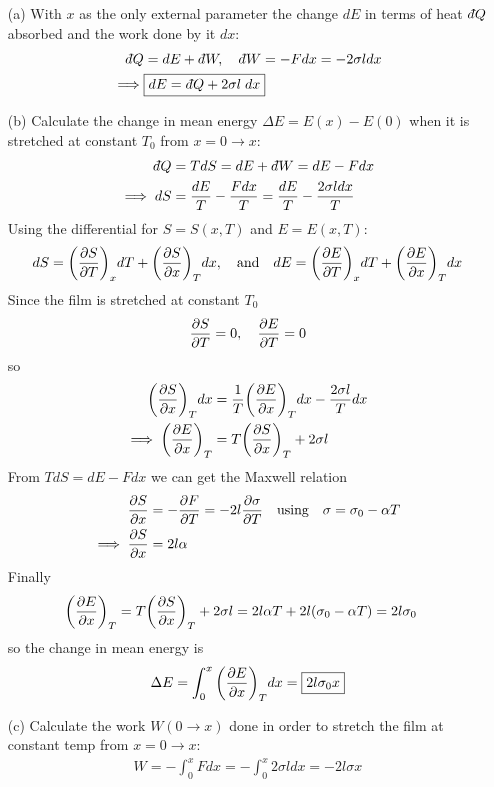 \documentclass[../main.tex]{subfiles}
\begin{document}
\begin{enumerate}
    \item [(a)] With $x$ as the only external parameter the change $dE$ in terms of heat $d\hspace*{-0.08em}\bar{}\hspace*{0.1em} Q$ absorbed and the work done by it $dx$:
    \begin{align*}
        d\hspace*{-0.08em}\bar{}\hspace*{0.1em} Q &= dE + d\hspace*{-0.08em}\bar{}\hspace*{0.1em} W, \quad d\hspace*{-0.08em}\bar{}\hspace*{0.1em} W = -F dx = -2\sigma l dx \\
        \implies & \boxed{
            dE = d\hspace*{-0.08em}\bar{}\hspace*{0.1em} Q + 2\sigma l\; dx
        }
    \end{align*}
    \item [(b)] Calculate the change in mean energy $\Delta E = E(x) - E(0)$ when it is stretched at constant $T_0$ from $x = 0 \to x$:
    \begin{align*}
        d\hspace*{-0.08em}\bar{}\hspace*{0.1em} Q &= T dS = dE + d\hspace*{-0.08em}\bar{}\hspace*{0.1em} W = dE - F dx \\
        \implies dS &= \frac{dE}{T} - \frac{F dx}{T} = \frac{dE}{T} - \frac{2\sigma l dx}{T}
    \end{align*}
    Using the differential for $S = S(x, T)$ and $E = E(x, T)$:
    \begin{align*}
        dS = \qt(\pdv{S}{T})_x dT + \qt(\pdv{S}{x})_T dx, \qand dE = \qt(\pdv{E}{T})_x dT + \qt(\pdv{E}{x})_T dx
    \end{align*}
    Since the film is stretched at constant $T_0$
    \begin{align*}
        \pdv{S}{T} = 0, \quad \pdv{E}{T} = 0
    \end{align*}
    so
    \begin{align*}
        \qt(\pdv{S}{x})_T dx &= \frac{1}{T} \qt(\pdv{E}{x})_T dx - \frac{2\sigma l}{T} dx \\
        \implies \qt(\pdv{E}{x})_T  &= T \qt(\pdv{S}{x})_T + 2\sigma l
    \end{align*}
    From $T dS = dE - F dx$ we can get the Maxwell relation
    \begin{align*}
        \pdv{S}{x} &= -\pdv{F}{T} = -2l \pdv{\sigma}{T} \qusing \sigma = \sigma_0 - \alpha T \\
        \implies \pdv{S}{x} &= 2l \alpha
    \end{align*}
    Finally
    \begin{align*}
        \qt(\pdv{E}{x})_T &= T \qt(\pdv{S}{x})_T + 2\sigma l = 2l \alpha T + 2l (\sigma_0 - \alpha T) = 2l \sigma_0
    \end{align*}
    so the change in mean energy is
    \begin{align*}
        \Delta E = \int_0^x \qt(\pdv{E}{x})_T dx = \boxed{ 2l \sigma_0 x }
    \end{align*}
    \item [(c)] Calculate the work $W (0 \to x)$ done in order to stretch the film at constant temp from $x = 0 \to x$:
    \begin{align*}
        W = - \int_0^x F dx = - \int_0^x 2\sigma l dx = \boxed{-2l \sigma x} 
    \end{align*}
\end{enumerate}
\end{document}
